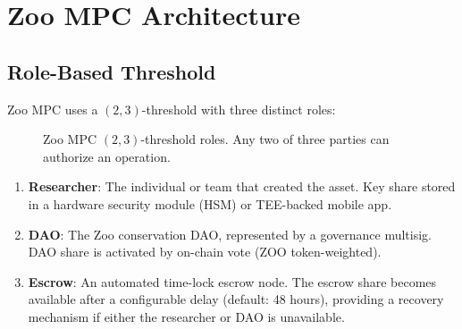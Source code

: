 \section{Zoo MPC Architecture}

\label{sec:architecture}

\subsection{Role-Based Threshold}

Zoo MPC uses a $(2, 3)$-threshold with three distinct roles:

\begin{figure}[t]
\centering
{}
\caption{Zoo MPC $(2, 3)$-threshold roles. Any two of three parties can authorize an operation.}
\label{fig:roles}
\end{figure}

\begin{enumerate}
    \item \textbf{Researcher}: The individual or team that created the asset. Key share stored in a hardware security module (HSM) or TEE-backed mobile app.

    \item \textbf{DAO}: The Zoo conservation DAO, represented by a governance multisig. DAO share is activated by on-chain vote (ZOO token-weighted).

    \item \textbf{Escrow}: An automated time-lock escrow node. The escrow share becomes available after a configurable delay (default: 48 hours), providing a recovery mechanism if either the researcher or DAO is unavailable.
\end{enumerate}


